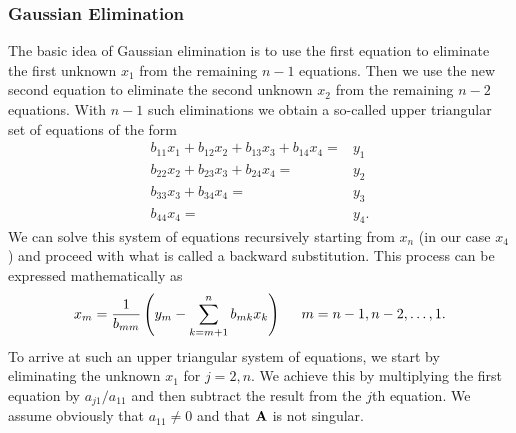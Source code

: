 \documentclass[compress]{beamer}
\begin{document}
\frame
{
  \frametitle{Gaussian Elimination}
\begin{small}
{\scriptsize
The basic idea of Gaussian elimination is to use the first equation to eliminate the first unknown $x_1$
from the remaining $n-1$ equations. Then we use the new second equation to eliminate the second unknown
$x_2$ from the remaining $n-2$ equations. With $n-1$ such eliminations
we obtain a so-called upper triangular set of equations of the form
\begin{eqnarray}\label{eq:gaussbacksub}
 b_{11}x_1 +b_{12}x_2 +b_{13}x_3 + b_{14}x_4=&y_1 \nonumber \\
 b_{22}x_2 + b_{23}x_3 + b_{24}x_4=&y_2 \nonumber \\
b_{33}x_3 + b_{34}x_4=&y_3 \nonumber \\
b_{44}x_4=&y_4. \nonumber
\end{eqnarray}
We can solve this system of equations recursively starting from $x_n$ (in our case $x_4$) and proceed with
what is called a backward substitution. This process can be expressed mathematically as
\begin{equation}
   x_m = \frac{1}{b_{mm}}\left(y_m-\sum_{k=m+1}^nb_{mk}x_k\right)\hspace{0.5cm} m=n-1,n-2,\dots,1.
\end{equation}
To arrive at such an upper triangular system of equations, we start by eliminating
the unknown $x_1$ for $j=2,n$. We achieve this by multiplying the first equation by $a_{j1}/a_{11}$ and then subtract
the result from the $j$th equation. We assume obviously that $a_{11}\ne 0$ and that
${\bf A}$ is not singular.
}
\end{small}
}
\end{document}
